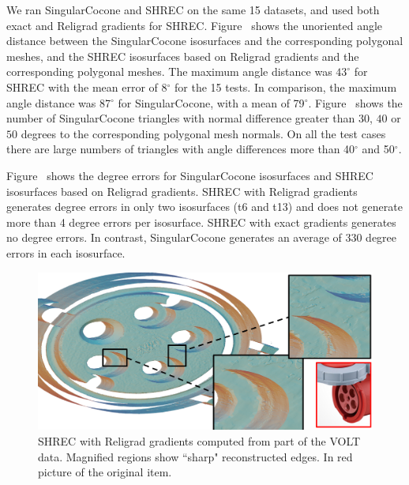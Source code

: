 We ran SingularCocone and SHREC on the same 15 datasets,
and used both exact and Religrad gradients for SHREC.
Figure~\protect{} shows the unoriented angle distance
between the SingularCocone isosurfaces and the corresponding polygonal meshes,
and the SHREC isosurfaces based on Religrad gradients
and the corresponding polygonal meshes.
The maximum angle distance was $43^\circ$ for SHREC
with the mean error of 8$^\circ$ for the 15 tests. 
In comparison, the maximum angle distance was 87$^\circ$ for SingularCocone,
with a mean of 79$^\circ$.  
Figure~\protect{}
shows the number of SingularCocone triangles 
with normal difference greater than $30$, $40$ or $50$ degrees
to the corresponding polygonal mesh normals.
On all the test cases there are large numbers of triangles
with angle differences more than 40$^\circ$ and 50$^\circ$.

Figure~\protect{} shows the degree errors
for SingularCocone isosurfaces
and SHREC isosurfaces based on Religrad gradients.
SHREC with Religrad gradients generates degree errors in only two isosurfaces
(t6 and t13) and does not generate more than 4 degree errors per isosurface.
SHREC with exact gradients generates no degree errors.
In contrast, SingularCocone generates an average of 330 degree errors
in each isosurface.


\begin{figure}[t]
\centering
	\includegraphics[width=\linewidth]{images/volt.eps}
	\caption{SHREC with Religrad gradients computed from part of the VOLT data. Magnified regions show ``sharp" reconstructed edges. In red picture of the original item.}
	\label{fig:ict:volt}
\end{figure}

